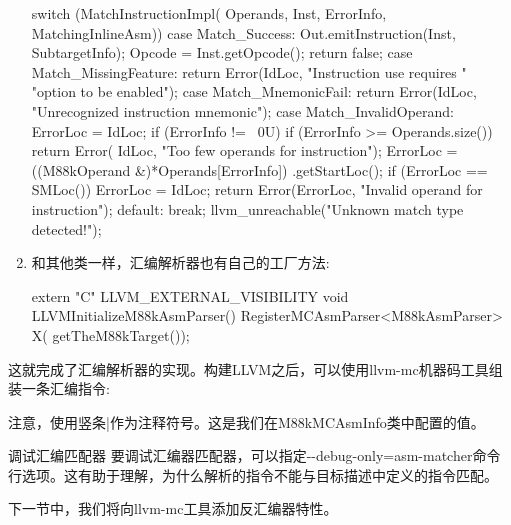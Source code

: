 \begin{enumerate}
\begin{cpp}
{    switch (MatchInstructionImpl(
            Operands, Inst, ErrorInfo, MatchingInlineAsm)) {
    case Match_Success:
        Out.emitInstruction(Inst, SubtargetInfo);
        Opcode = Inst.getOpcode();
        return false;
    case Match_MissingFeature:
        return Error(IdLoc, "Instruction use requires "
                     "option to be enabled");
    case Match_MnemonicFail:
        return Error(IdLoc,
                     "Unrecognized instruction mnemonic");
    case Match_InvalidOperand: {
        ErrorLoc = IdLoc;
        if (ErrorInfo != ~0U) {
            if (ErrorInfo >= Operands.size())
                return Error(
                    IdLoc, "Too few operands for instruction");
            ErrorLoc = ((M88kOperand &)*Operands[ErrorInfo])
                    .getStartLoc();
            if (ErrorLoc == SMLoc())
                ErrorLoc = IdLoc;
        }
        return Error(ErrorLoc,
                     "Invalid operand for instruction");
    }
    default:
        break;
    }
    llvm_unreachable("Unknown match type detected!");
}
\end{cpp}

\item
和其他类一样，汇编解析器也有自己的工厂方法:

\begin{cpp}
extern "C" LLVM_EXTERNAL_VISIBILITY void
LLVMInitializeM88kAsmParser() {
    RegisterMCAsmParser<M88kAsmParser> X(
        getTheM88kTarget());
}
\end{cpp}
\end{enumerate}

这就完成了汇编解析器的实现。构建LLVM之后，可以使用llvm-mc机器码工具组装一条汇编指令:


注意，使用竖条|作为注释符号。这是我们在M88kMCAsmInfo类中配置的值。

\begin{myTip}{调试汇编匹配器}
要调试汇编器匹配器，可以指定-{}-debug-only=asm-matcher命令行选项。这有助于理解，为什么解析的指令不能与目标描述中定义的指令匹配。
\end{myTip}

下一节中，我们将向llvm-mc工具添加反汇编器特性。































